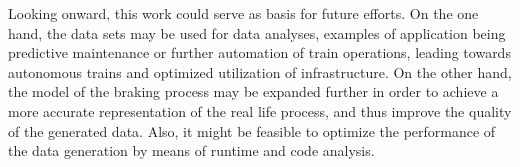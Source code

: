 \par
Looking onward, this work could serve as basis for future efforts. On the one hand, the data sets may be used for data analyses, examples of application being predictive maintenance or further automation of train operations, leading towards autonomous trains and optimized utilization of infrastructure. On the other hand, the model of the braking process may be expanded further in order to achieve a more accurate representation of the real life process, and thus improve the quality of the generated data. Also, it might be feasible to optimize the performance of the data generation by means of runtime and code analysis.